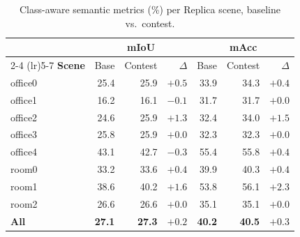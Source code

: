 \begin{otherlanguage}{english}
\begin{table}[ht]
  \centering
  \small
  \renewcommand{\arraystretch}{1.2}
  \begin{tabular}{@{}l r r r r r r@{}}
    \toprule
    & \multicolumn{3}{c}{\textbf{mIoU}} & \multicolumn{3}{c}{\textbf{mAcc}} \\
    \cmidrule(lr){2-4} \cmidrule(lr){5-7}
    \textbf{Scene} & Base & Contest & $\Delta$ & Base & Contest & $\Delta$ \\
    \midrule
    office0 & 25.4 & 25.9 & $+0.5$ & 33.9 & 34.3 & $+0.4$ \\
    office1 & 16.2 & 16.1 & $-0.1$ & 31.7 & 31.7 & $+0.0$ \\
    office2 & 24.6 & 25.9 & $+1.3$ & 32.4 & 34.0 & $+1.5$ \\
    office3 & 25.8 & 25.9 & $+0.0$ & 32.3 & 32.3 & $+0.0$ \\
    office4 & 43.1 & 42.7 & $-0.3$ & 55.4 & 55.8 & $+0.4$ \\
    room0   & 33.2 & 33.6 & $+0.4$ & 39.9 & 40.3 & $+0.4$ \\
    room1   & 38.6 & 40.2 & $+1.6$ & 53.8 & 56.1 & $+2.3$ \\
    room2   & 26.6 & 26.6 & $+0.0$ & 35.1 & 35.1 & $+0.0$ \\
    \midrule
    \textbf{All} & \textbf{27.1} & \textbf{27.3} & $\mathbf{+0.2}$ & \textbf{40.2} & \textbf{40.5} & $\mathbf{+0.3}$ \\
    \bottomrule
  \end{tabular}
  \caption{Class-aware semantic metrics (\%) per Replica scene, baseline vs.\ contest.}
  \label{tab:contest_semantic}
\end{table}

\end{otherlanguage}
%
%
%

